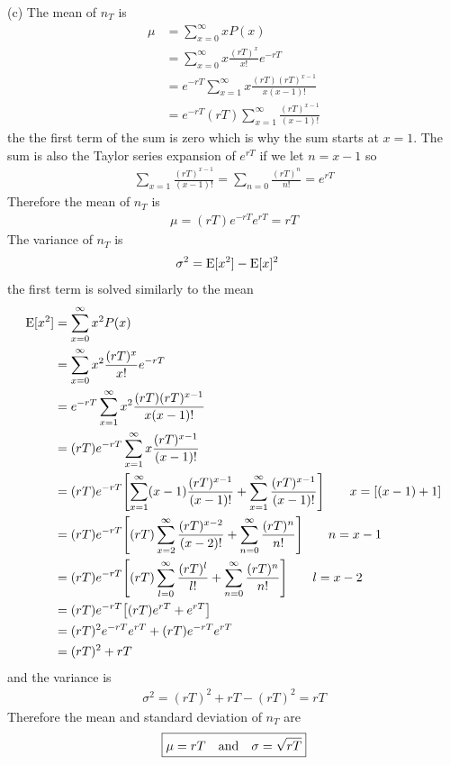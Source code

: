 \documentclass[../main.tex]{subfiles}
\begin{document}
(c) The mean of $n_T$ is
\begin{align*}
    \mu &= \sum_{x=0}^{\infty} x P(x) \\
    &= \sum_{x=0}^{\infty} x \frac{(rT)^x}{x!} e^{-rT} \\
    &= e^{-rT} \sum_{x=1}^{\infty} x\frac{(rT)(rT)^{x-1}}{x(x-1)!} \\
    &= e^{-rT} (rT) \sum_{x=1}^{\infty} \frac{(rT)^{x-1}}{(x-1)!}
\end{align*}
the the first term of the sum is zero which is why the sum starts at $x = 1$. The sum is also
the Taylor series expansion of $e^{rT}$ if we let $n = x - 1$ so
\begin{align*}
    \sum_{x=1} \frac{(rT)^{x-1}}{(x-1)!} = \sum_{n=0} \frac{(rT)^n}{n!} = e^{rT}
\end{align*}
Therefore the mean of $n_T$ is
\begin{align*}
    \mu = (rT) e^{-rT} e^{rT} = rT
\end{align*}
The variance of $n_T$ is
\begin{align*}
    \sigma^2 &= \operatorname{E}[x^2] - \operatorname{E}[x]^2
\end{align*}
the first term is solved similarly to the mean
\begin{align*}
    \E[x^2] &= \sum_{x=0}^{\infty} x^2 P(x) \\
    &= \sum_{x=0}^{\infty} x^2 \frac{(rT)^x}{x!} e^{-rT} \\
    &= e^{-rT} \sum_{x=1}^{\infty} x^2 \frac{(rT)(rT)^{x-1}}{x(x-1)!} \\
    &= (rT) e^{-rT} \sum_{x=1}^{\infty} x \frac{(rT)^{x-1}}{(x-1)!} \\
    &= (rT) e^{-rT} \qt[\sum_{x=1}^{\infty} (x-1) \frac{(rT)^{x-1}}{(x-1)!} + 
    \sum_{x=1}^{\infty} \frac{(rT)^{x-1}}{(x-1)!}
    ] \qquad x = [(x - 1) + 1]\\
    &= (rT) e^{-rT} \qt[(rT)\sum_{x=2}^{\infty}  \frac{(rT)^{x-2}}{(x-2)!} +
    \sum_{n=0}^{\infty} \frac{(rT)^{n}}{n!}
    ] \qquad n = x - 1 \\
    &= (rT) e^{-rT} \qt[(rT)\sum_{l=0}^{\infty}  \frac{(rT)^{l}}{l!} +
    \sum_{n=0}^{\infty} \frac{(rT)^{n}}{n!}
    ] \qquad l = x - 2 \\
    &= (rT) e^{-rT} \qt[(rT) e^{rT} + e^{rT} ]  \\
    &= (rT)^2 e^{-rT} e^{rT} + (rT) e^{-rT} e^{rT} \\
    &= (rT)^2 + rT
\end{align*}
and the variance is
\begin{align*}
    \sigma^2 = (rT)^2 + rT - (rT)^2 = rT
\end{align*}
Therefore the mean and standard deviation of $n_T$ are
\begin{align*}
    \boxed{\mu = rT \qand \sigma = \sqrt{rT}}
\end{align*}
\end{document}
